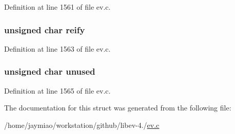 \-Definition at line 1561 of file ev.\-c.

\hypertarget{struct_a_n_f_d_a9f83e28e70418fa3d19299c0a6562dc9}{
\subsubsection[{reify}]{\setlength{\rightskip}{0pt plus 5cm}unsigned char {\bf reify}}}\label{struct_a_n_f_d_a9f83e28e70418fa3d19299c0a6562dc9}


\-Definition at line 1563 of file ev.\-c.

\hypertarget{struct_a_n_f_d_ad10d012877d07ca3b2e818f11bf97a0f}{
\subsubsection[{unused}]{\setlength{\rightskip}{0pt plus 5cm}unsigned char {\bf unused}}}\label{struct_a_n_f_d_ad10d012877d07ca3b2e818f11bf97a0f}


\-Definition at line 1565 of file ev.\-c.



\-The documentation for this struct was generated from the following file\-:\begin{DoxyCompactItemize}
\item 
/home/jaymiao/workstation/github/libev-\/4./\hyperlink{ev_8c}{ev.\-c}\end{DoxyCompactItemize}
